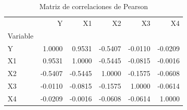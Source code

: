 \begin{table}
\caption{Matriz de correlaciones de Pearson}
\label{tab:correlaciones_pearson}
\begin{tabular}{lrrrrr}
\toprule
 & Y & X1 & X2 & X3 & X4 \\
Variable &  &  &  &  &  \\
\midrule
Y & 1.0000 & 0.9531 & -0.5407 & -0.0110 & -0.0209 \\
X1 & 0.9531 & 1.0000 & -0.5445 & -0.0815 & -0.0016 \\
X2 & -0.5407 & -0.5445 & 1.0000 & -0.1575 & -0.0608 \\
X3 & -0.0110 & -0.0815 & -0.1575 & 1.0000 & -0.0614 \\
X4 & -0.0209 & -0.0016 & -0.0608 & -0.0614 & 1.0000 \\
\bottomrule
\end{tabular}
\end{table}

